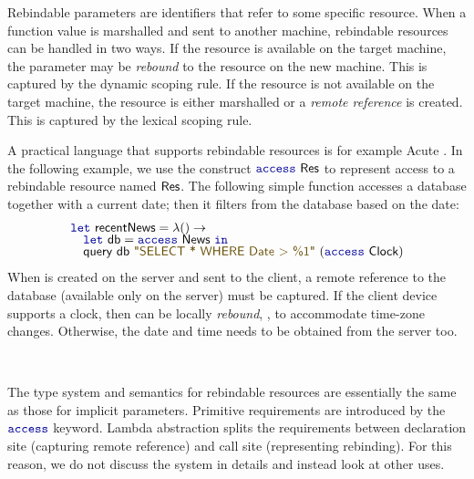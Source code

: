 Rebindable parameters are identifiers that refer to some specific resource. When a function value
is marshalled and sent to another machine, rebindable resources can be handled in two ways.
If the resource is available on the target machine, the parameter may be \emph{rebound} to
the resource on the new machine. This is captured by the dynamic scoping rule. If the
resource is not available on the target machine, the resource is either marshalled or a \emph{remote
reference} is created. This is captured by the lexical scoping rule.

A practical language that supports rebindable resources is for example Acute \cite{app-distributed-acute}.
In the following example, we use the construct $\kvd{access}~\ident{Res}$ to represent
access to a rebindable resource named $\textnormal{\sffamily Res}$. The following simple function accesses
a database together with a current date; then it filters from the database based on the date:
%
\begin{equation*}
\begin{array}{l}
 \kvd{let}~\ident{recentNews} = \lambda () \rightarrow\\[-0.25em]
 \quad\kvd{let}~\ident{db} = \kvd{access}~\ident{News}~\kvd{in}\\[-0.25em]
 \quad\ident{query}~\ident{db}~\str{SELECT * WHERE Date > \%1}~(\kvd{access}~\ident{Clock})
\end{array}
\end{equation*}
%
When  is created on the server and sent to the client, a remote reference to
the database (available only on the server) must be captured. If the client device supports a
clock, then  can be locally \emph{rebound}, \eg, to accommodate time-zone changes.
Otherwise, the date and time needs to be obtained from the server too.

~

The type system and semantics for rebindable resources are essentially the same as those for
implicit parameters. Primitive requirements are introduced by the $\kvd{access}$ keyword.
Lambda abstraction splits the requirements between declaration site (capturing remote reference)
and call site (representing rebinding). For this reason, we do not discuss the system in details
and instead look at other uses.


